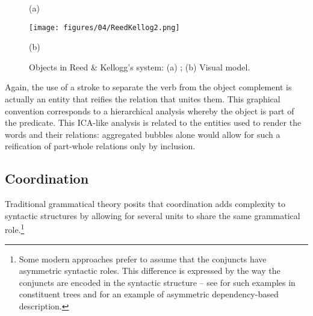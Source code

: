 \documentclass[english,output=paper,colorlinks,citecolor=brown]{../langscibook}
\begin{document}
 \begin{figure}
     (a) \hspace{1em} \begin{minipage}[c]{.45\textwidth}\texttt{[image: figures/04/ReedKellog2.png]}\end{minipage}\hfill
     (b) \hspace{1em} 
     \caption{Objects in Reed \& Kellogg’s system: (a) \citeyear[53]{ReedBrainerd1879}; (b) Visual model.\label{fig:4:6}}
 \end{figure}


Again, the use of a stroke to separate the verb from the object complement is actually an entity that reifies the relation that unites them. This graphical convention corresponds to a hierarchical analysis whereby the object is part of the predicate. This ICA-like analysis is related to the entities used to render the words and their relations: aggregated bubbles alone would allow for such a reification of part-whole relations only by inclusion.

\subsection{Coordination}\label{sec:4:4.2}

Traditional grammatical theory posits that coordination adds complexity to syntactic structures by allowing for several units to share the same grammatical role.\footnote{\textrm{Some modern approaches prefer to assume that the conjuncts have asymmetric syntactic roles. This difference is expressed by the way the conjuncts are encoded in the syntactic structure – see \citet{Mouret2007} for such examples in constituent trees and \citet[50--51]{PolguereMeltschuk2009} for an example of asymmetric dependency-based description.}} 
\end{document}
